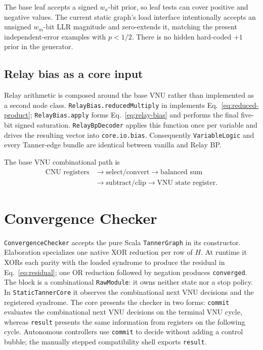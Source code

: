 \documentclass[10pt,conference]{IEEEtran}
\begin{document}
The base leaf accepts a signed $w_a$-bit prior, so leaf tests can cover positive
and negative values.  The current static graph's load interface intentionally
accepts an unsigned $w_m$-bit LLR magnitude and zero-extends it, matching the
present independent-error examples with $p<1/2$.  There is no hidden hard-coded
$+1$ prior in the generator.

\subsection{Relay bias as a core input}
Relay arithmetic is composed around the base VNU rather than implemented as a
second node class.  \texttt{RelayBias.reducedMultiply} in
 implements Eq.~\eqref{eq:reduced-product};
\texttt{RelayBias.apply} forms Eq.~\eqref{eq:relay-bias} and performs the final
five-bit signed saturation.  \texttt{RelayBpDecoder} applies this function once
per variable and drives the resulting vector into \texttt{core.io.bias}.
Consequently \texttt{VariableLogic} and every Tanner-edge bundle are identical
between vanilla and Relay BP.

The base VNU combinational path is
\begin{equation}
 \begin{aligned}
 \text{CNU registers}&\rightarrow\text{select/convert}
 \rightarrow\text{balanced sum}\\
 &\rightarrow\text{subtract/clip}
 \rightarrow\text{VNU state register}.
 \end{aligned}
\end{equation}

\section{Convergence Checker}
\texttt{ConvergenceChecker} accepts the pure Scala \texttt{TannerGraph} in its
constructor.  Elaboration specializes one native XOR reduction per row of
$H$.  At runtime it XORs each parity with the loaded syndrome to produce the
residual in Eq.~\eqref{eq:residual}; one OR reduction followed by negation
produces \texttt{converged}.  The block is a combinational \texttt{RawModule}:
it owns neither state nor a stop policy.  In \texttt{StaticTannerCore} it
observes the combinational next VNU decisions and the registered syndrome.
The core presents the checker in
two forms: \texttt{commit} evaluates the combinational next VNU decisions on
the terminal VNU cycle, whereas \texttt{result} presents the same information
from registers on the following cycle.  Autonomous controllers use
\texttt{commit} to decide without adding a control bubble; the manually stepped
compatibility shell exports \texttt{result}.
\end{document}
